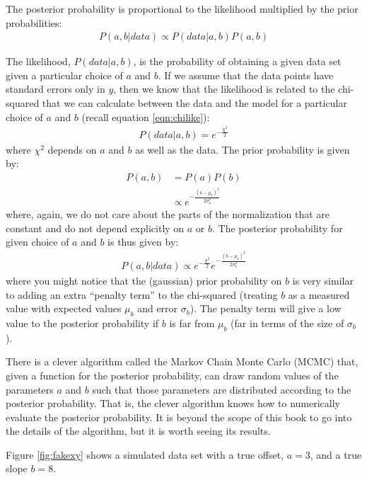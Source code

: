 The posterior probability is proportional to the likelihood multiplied by the prior probabilities:
\begin{align*}
P(a,b|data) \propto P(data | a,b)P(a,b)
\end{align*}

The likelihood, $P(data | a,b)$, is the probability of obtaining a given data set given a particular choice of $a$ and $b$. If we assume that the data points have standard errors only in $y$, then we know that the likelihood is related to the chi-squared that we can calculate between the data and the model for a particular choice of $a$ and $b$ (recall equation \ref{eqn:chilike}):
\begin{align*}
P(data | a,b) = e^{-\frac{\chi^2}{2}}
\end{align*}
where $\chi^2$ depends on $a$ and $b$ as well as the data. The prior probability is given by:
\begin{align}
P(a,b) &= P(a)P(b)\nonumber\\
&\propto e^{-\frac{(b-\mu_b)^2}{2\sigma_b^2}}
\end{align}
where, again, we do not care about the parts of the normalization that are constant and do not depend explicitly on $a$ or $b$. The posterior probability for given choice of $a$ and $b$ is thus given by:
\begin{align}
P(a,b|data) \propto e^{-\frac{\chi^2}{2}}e^{-\frac{(b-\mu_b)^2}{2\sigma_b^2}}
\end{align}
where you might notice that the (gaussian) prior probability on $b$ is very similar to adding an extra ``penalty term'' to the chi-squared (treating $b$ as a measured value with expected values $\mu_b$ and error $\sigma_b$). The penalty term will give a low value to the posterior probability if $b$ is far from $\mu_b$ (far in terms of the size of $\sigma_b$).

There is a clever algorithm called the Markov Chain Monte Carlo (MCMC) that, given a function for the posterior probability, can draw random values of the parameters $a$ and $b$ such that those parameters are distributed according to the posterior probability. That is, the clever algorithm knows how to numerically evaluate the posterior probability. It is beyond the scope of this book to go into the details of the algorithm, but it is worth seeing its results.

Figure \ref{fig:fakexy} shows a simulated data set with a true offset, $a=3$, and a true slope $b=8$. 


